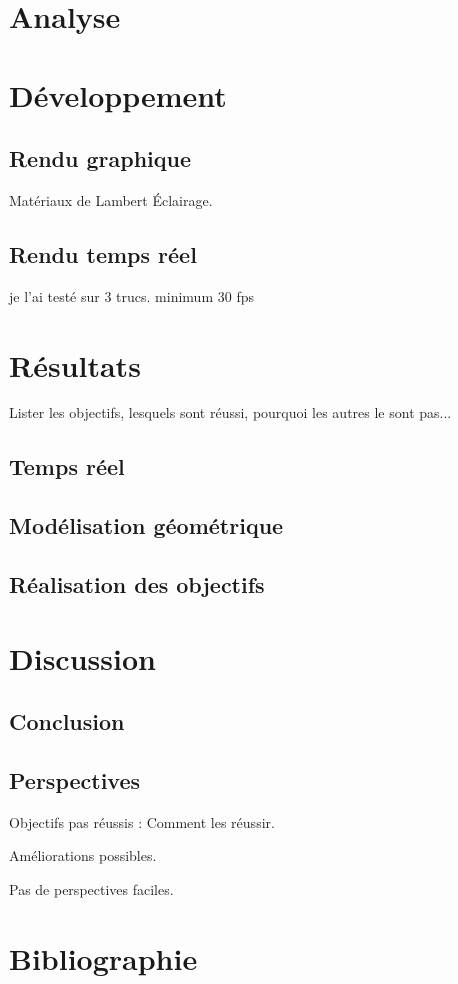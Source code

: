 \documentclass[a4paper,12pt,notitlepage]{report}
\begin{document}

\vspace*{\fill}

\vspace*{\fill}

\tableofcontents



\chapter{Analyse}



\chapter{Développement}

\section{Rendu graphique}
Matériaux de Lambert
Éclairage.






\section{Rendu temps réel}
je l'ai testé sur 3 trucs. minimum 30 fps

\chapter{Résultats}
Lister les objectifs, lesquels sont réussi, pourquoi les autres le sont pas...
\section{Temps réel}
\section{Modélisation géométrique}
\section{Réalisation des objectifs}

\chapter{Discussion}
\section{Conclusion}
\section{Perspectives}
Objectifs pas réussis : Comment les réussir.

Améliorations possibles.

Pas de perspectives faciles.


\chapter{Bibliographie}
\nocite{*} %
\printbibliography
\end{document}
